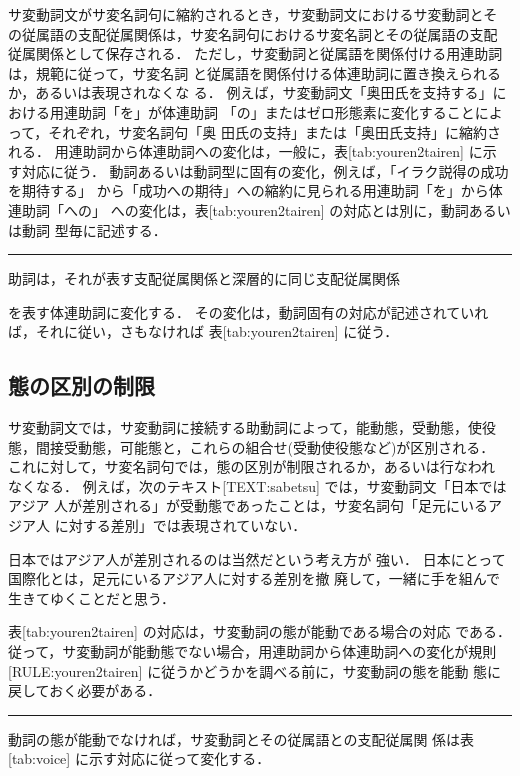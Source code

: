 サ変動詞文がサ変名詞句に縮約されるとき，サ変動詞文におけるサ変動詞とそ
の従属語の支配従属関係は，サ変名詞句におけるサ変名詞とその従属語の支配
従属関係として保存される．
ただし，サ変動詞と従属語を関係付ける用連助詞は，規範に従って，サ変名詞
と従属語を関係付ける体連助詞に置き換えられるか，あるいは表現されなくな
る．
例えば，サ変動詞文「奥田氏を支持する」における用連助詞「を」が体連助詞
「の」またはゼロ形態素に変化することによって，それぞれ，サ変名詞句「奥
田氏の支持」または「奥田氏支持」に縮約される．
用連助詞から体連助詞への変化は，一般に，表[tab:youren2tairen] に示
す対応に従う．
動詞あるいは動詞型に固有の変化，例えば，「イラク説得の成功を期待する」
から「成功への期待」への縮約に見られる用連助詞「を」から体連助詞「への」
への変化は，表[tab:youren2tairen] の対応とは別に，動詞あるいは動詞
型毎に記述する．
\begin{RULE}
\rule 用連助詞は，それが表す支配従属関係と深層的に同じ支配従属関係

を表す体連助詞に変化する．
その変化は，動詞固有の対応が記述されていれば，それに従い，さもなければ
表[tab:youren2tairen] に従う．
\end{RULE}



\subsection{態の区別の制限}

サ変動詞文では，サ変動詞に接続する助動詞によって，能動態，受動態，使役
態，間接受動態，可能態と，これらの組合せ(受動使役態など)が区別される．
これに対して，サ変名詞句では，態の区別が制限されるか，あるいは行なわれ
なくなる．
例えば，次のテキスト[TEXT:sabetsu] では，サ変動詞文「日本ではアジア
人が差別される」が受動態であったことは，サ変名詞句「足元にいるアジア人
に対する差別」では表現されていない．
\begin{TEXT}
\text 日本ではアジア人が差別されるのは当然だという考え方が
強い．
日本にとって国際化とは，足元にいるアジア人に対する差別を撤
廃して，一緒に手を組んで生きてゆくことだと思う．
\end{TEXT}

表[tab:youren2tairen] の対応は，サ変動詞の態が能動である場合の対応
である．
従って，サ変動詞が能動態でない場合，用連助詞から体連助詞への変化が規則
[RULE:youren2tairen] に従うかどうかを調べる前に，サ変動詞の態を能動
態に戻しておく必要がある．
\begin{RULE}
\rule サ変動詞の態が能動でなければ，サ変動詞とその従属語との支配従属関
係は表[tab:voice] に示す対応に従って変化する．
\end{RULE}



